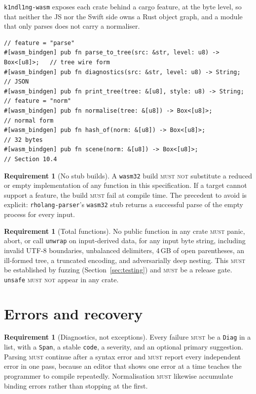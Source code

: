 \documentclass[11pt,a4paper]{article}
\newcommand{\code}[1]{\texttt{#1}}
\newcommand{\MUST}{\textsc{must}}
\newcommand{\MUSTNOT}{\textsc{must not}}
\theoremstyle{definition}
\newtheorem{requirement}[definition]{Requirement}
\theoremstyle{plain}
\begin{document}
\code{k1ndl1ng-wasm} exposes each crate behind a cargo feature, at the byte
level, so that neither the JS nor the Swift side owns a Rust object graph, and a
module that only parses does not carry a normaliser.

\begin{lstlisting}
// feature = "parse"
#[wasm_bindgen] pub fn parse_to_tree(src: &str, level: u8) -> Box<[u8]>;   // tree wire form
#[wasm_bindgen] pub fn diagnostics(src: &str, level: u8) -> String;        // JSON
#[wasm_bindgen] pub fn print_tree(tree: &[u8], style: u8) -> String;
// feature = "norm"
#[wasm_bindgen] pub fn normalise(tree: &[u8]) -> Box<[u8]>;                // normal form
#[wasm_bindgen] pub fn hash_of(norm: &[u8]) -> Box<[u8]>;                  // 32 bytes
#[wasm_bindgen] pub fn scene(norm: &[u8]) -> Box<[u8]>;                    // Section 10.4
\end{lstlisting}

\begin{requirement}[No stub builds]\label{req:nostub}
A \code{wasm32} build \MUSTNOT{} substitute a reduced or empty implementation of
any function in this specification. If a target cannot support a feature, the
build \MUST{} fail at compile time. The precedent to avoid is explicit:
\code{rholang-parser}'s \code{wasm32} stub returns a successful parse of the
empty process for every input.
\end{requirement}

\begin{requirement}[Total functions]\label{req:total}
No public function in any crate \MUST{} panic, abort, or call \code{unwrap} on
input-derived data, for any input byte string, including invalid UTF-8
boundaries, unbalanced delimiters, 4\,GB of open parentheses, an ill-formed
tree, a truncated encoding, and adversarially deep nesting. This \MUST{} be
established by fuzzing (Section~\ref{sec:testing}) and \MUST{} be a release
gate. \code{unsafe} \MUSTNOT{} appear in any crate.
\end{requirement}
\section{Errors and recovery}\label{sec:errors}

\begin{requirement}[Diagnostics, not exceptions]
Every failure \MUST{} be a \code{Diag} in a list, with a \code{Span}, a stable
\code{code}, a severity, and an optional primary suggestion. Parsing \MUST{}
continue after a syntax error and \MUST{} report every independent error in one
pass, because an editor that shows one error at a time teaches the programmer to
compile repeatedly. Normalisation \MUST{} likewise accumulate binding errors
rather than stopping at the first.
\end{requirement}
\end{document}
